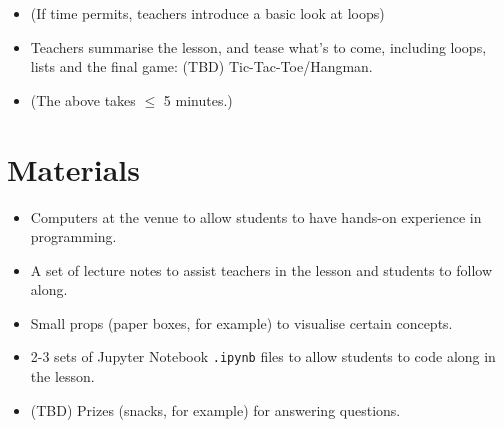 \documentclass{article}
\def\T{Teachers }
\def\t{teachers }
\def\s{students }
\begin{document}
\begin{itemize}
\item (If time permits, \t introduce a basic look at loops)

\item \T summarise the lesson, and tease what's to come, including loops, lists and the final game: (TBD) Tic-Tac-Toe/Hangman.

\item[] (The above takes $\leq$ 5 minutes.)
\end{itemize} 

\section*{Materials}

\begin{itemize}
\item Computers at the venue to allow \s to have hands-on experience in programming.
\item A set of lecture notes to assist \t in the lesson and \s to follow along.
\item Small props (paper boxes, for example) to visualise certain concepts.
\item 2-3 sets of Jupyter Notebook \texttt{.ipynb} files to allow \s to code along in the lesson.
\item (TBD) Prizes (snacks, for example) for answering questions.
\end{itemize}
\end{document}
